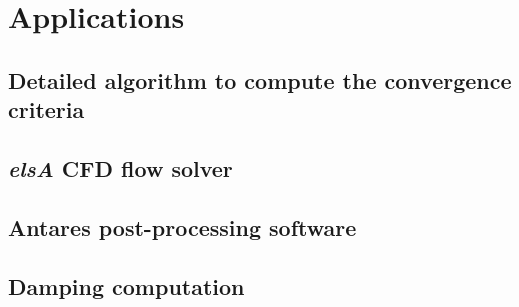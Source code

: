 \documentclass[a4paper, twoside, 11pt]{book}
\begin{document}
\part{Applications}
\label{part3}






\appendix
\chapter{Detailed algorithm to compute the convergence criteria}


\chapter{\emph{elsA} CFD flow solver}


\chapter{Antares post-processing software}



\chapter{Damping computation}



\backmatter


\label{Bibliography}




\end{document}
